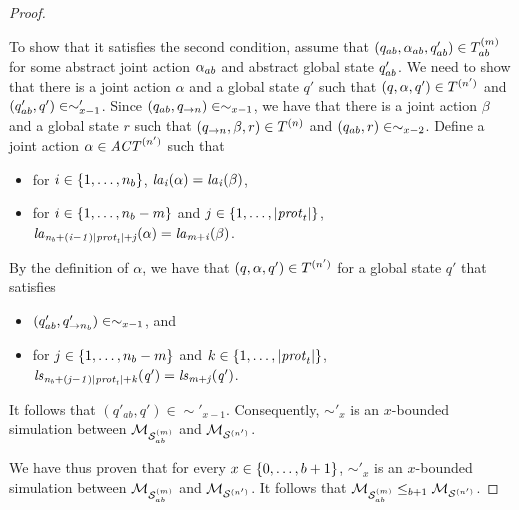 \documentclass{article}
\begin{document}
\begin{proof}
\begin{itemize}
  To show that it satisfies the second condition, assume that $(q_{ab},
  \alpha_{ab}, q_{ab}') \in T^{(m)}_{ab}$ for some abstract joint action
  $\alpha_{ab}$ and abstract global state $q_{ab}'$. We need to show that there
  is a joint action $\alpha$ and a  global state $q'$ such that $(q, \alpha, q')
  \in T^{(n')}$ and $(q_{ab}', q') \in \sim'_{x-1}$. Since $(q_{ab},
  q_{\rightarrow n}) \in \sim_{x-1}$, we have that there is a joint action
  $\beta$ and a global state $r$ such that $(q_{\rightarrow n}, \beta, r) \in
  T^{(n)}$ and $(q_{ab}, r) \in \sim_{x-2}$. Define a joint action
  $\alpha \in \mathit{ACT}^{(n')}$ such that
  
  \begin{itemize}
      \item for $i \in \left \{ 1,\ldots,n_b \right \}$, $\it{la}_{i}({\alpha}) = \it{la}_{i}({\beta})$, 
      \item  for $i \in \left \{ 1, \ldots, n_b-m \right \}$ and $j \in \left \{ 1,\ldots,|\mathit{prot}_{t}| \right \}$, $\it{la}_{n_b + (i-1)|\mathit{prot}_{t}| + j}({\alpha}) = \it{la}_{m+i}({\beta})$.
  \end{itemize}

  By the definition of $\alpha$, we have that $(q, \alpha, q')  \in
  T^{(n')}$ for a global state $q'$ that satisfies

  \begin{itemize}
    \item  $(q_{ab}',q'_{\rightarrow n_b}) \in \sim_{x-1}$, and 
    \item  for $j \in \left \{ 1, \ldots, n_b-m \right \}$ and $k \in \left \{ 1,\ldots,|\mathit{prot}_{t}| \right \}$, 
        $\it{ls}_{n_b + (j-1)|\mathit{prot}_{t}| + k}(q') = \it{ls}_{m+j}(q')$.
  \end{itemize}

  It follows that $(q'_{ab}, q') \in \sim'_{x-1}$. Consequently, $\sim'_{x}$
  is an $x$-bounded simulation between $\mathcal{M}_{\mathcal{S}_{ab}^{(m)}}$ and $\mathcal{M}_{\mathcal{S}^{(n')}}$.

\end{itemize}

We have thus proven that for every $x \in \left \{ 0, \ldots, b+1 \right \}$, $\sim'_x$ is an
$x$-bounded simulation between $\mathcal{M}_{\mathcal{S}_{ab}^{(m)}}$ and $\mathcal{M}_{\mathcal{S}^{(n')}}$.  It follows  that
$\mathcal{M}_{\mathcal{S}_{ab}^{(m)}} \leq_{b+1} \mathcal{M}_{\mathcal{S}^{(n')}}$.

\end{proof}
\end{document}
